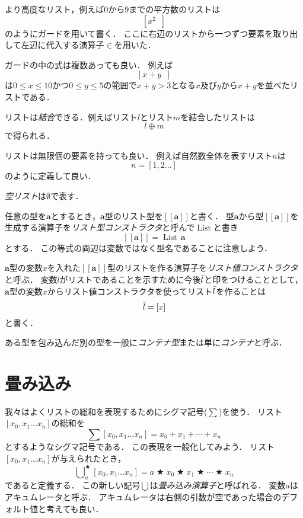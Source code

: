 \documentclass[twocolumn]{jsbook}
\def\[{[\![}
\def\]{]\!]}
\newcommand{\hsklType}[1]{\textbf{#1}}
\newcommand{\hsklTypeConstructor}[1]{\mathop{\mathrm{#1}}}
\DeclareMathOperator{\hsklListConstructor}{\hsklTypeConstructor{List}}
\newcommand{\hsklAppend}{\oplus}
\newcommand{\hsklEmptyList}{\emptyset}
\newcommand{\hsklList}[1]{\Bar{#1}}
\newcommand{\hsklListType}[1]{\[#1\]}
\newcommand{\hsklTypeConstruct}[2]{#1\,#2}
\DeclareMathOperator{\mathAnyBinaryOperator}{\bigstar}
\DeclareMathOperator*{\mathFold}{\bigcup}
\DeclareMathOperator{\mathFrom}{\in}
\newcommand{\mathGuard}[1]{\mathop{\mid_{#1}}}
\newcommand{\keyword}[1]{\emph{#1}}
\begin{document}
より高度なリスト，例えば$0$から$9$までの平方数のリストは$$\left[x^2\mathGuard{x\mathFrom{[0,1\dots9]}}\right]$$のようにガードを用いて書く．
ここに右辺のリストから一つずつ要素を取り出して左辺に代入する演算子$\mathFrom$を用いた．

ガードの中の式は複数あっても良い．
例えば$$\left[x+y\mathGuard{x\mathFrom[0,1\dots9],\,y\mathFrom[0,1\dots5],\,x+y>3}\right]$$は$0\le x\le 10$かつ$0\le y\le 5$の範囲で$x+y>3$となる$x$及び$y$から$x+y$を並べたリストである．

リストは\keyword{結合}できる．例えばリスト$l$とリスト$m$を結合したリストは$$l\hsklAppend m$$で得られる．

リストは無限個の要素を持っても良い．
例えば自然数全体を表すリスト$n$は$$n=[1,2\dots]$$のように定義して良い．

\keyword{空リスト}は$\hsklEmptyList$で表す．

任意の型を$\hsklType{a}$とするとき，$\hsklType{a}$型のリスト型を$\hsklListType{\hsklType{a}}$と書く．
型$\hsklType{a}$から型$\hsklListType{\hsklType{a}}$を生成する演算子を\keyword{リスト型コンストラクタ}と呼んで$\hsklListConstructor$と書き$$\hsklListType{\hsklType{a}}=\hsklTypeConstruct{\hsklListConstructor}{\hsklType{a}}$$とする．
この等式の両辺は変数ではなく型名であることに注意しよう．

$\hsklType{a}$型の変数$x$を入れた$\hsklListType{\hsklType{a}}$型のリストを作る演算子を\keyword{リスト値コンストラクタ}と呼ぶ．
変数$l$がリストであることを示すために今後$\hsklList{l}$と印をつけることとして，$\hsklType{a}$型の変数$x$からリスト値コンストラクタを使ってリスト$\hsklList{l}$を作ることは$$\hsklList{l}=[x]$$と書く．

ある型を包み込んだ別の型を一般に\keyword{コンテナ型}または単に\keyword{コンテナ}と呼ぶ．

\section{畳み込み}

我々はよくリストの総和を表現するためにシグマ記号($\sum$)を使う．
リスト$[x_0,x_1\dots x_n]$の総和を$$\sum[x_0,x_1\dots x_n]=x_0+x_1+\dotsb+x_n$$とするようなシグマ記号である．
この表現を一般化してみよう．
リスト$[x_0,x_1\dots x_n]$が与えられたとき，$$\mathFold^{\mathAnyBinaryOperator}_{a}[x_0,x_1\dots x_n]=a\mathAnyBinaryOperator x_0\mathAnyBinaryOperator x_1\mathAnyBinaryOperator\dotsb\mathAnyBinaryOperator x_n$$であると定義する．
この新しい記号$\mathFold$は\keyword{畳み込み演算子}と呼ばれる．
変数$a$はアキュムレータと呼ぶ．
アキュムレータは右側の引数が空であった場合のデフォルト値と考えても良い．
\end{document}
